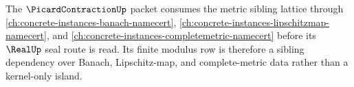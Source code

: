 The $\PicardContractionUp$ packet consumes the metric sibling lattice through \autoref{ch:concrete-instances-banach-namecert}, \autoref{ch:concrete-instances-lipschitzmap-namecert}, and \autoref{ch:concrete-instances-completemetric-namecert} before its $\RealUp$ seal route is read. Its finite modulus row is therefore a sibling dependency over Banach, Lipschitz-map, and complete-metric data rather than a kernel-only island.





